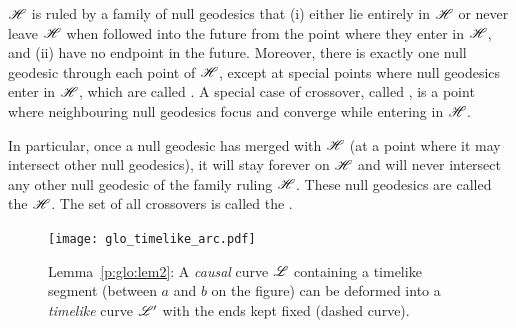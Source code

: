 \begin{prop}
\label{p:glo:prop3}
$\mathscr{H}$ is ruled by a family of null geodesics that (i) either lie entirely
in $\mathscr{H}$ or never leave $\mathscr{H}$ when followed into the future from the
point where they enter in $\mathscr{H}$, and
(ii) have no endpoint in the future.
Moreover, there is exactly one null geodesic through each point of $\mathscr{H}$,
except at special points where null geodesics enter in $\mathscr{H}$, which are
called . A special case
of crossover, called , is a point
where neighbouring null geodesics focus and converge while entering in $\mathscr{H}$.
\end{prop}
In particular, once a null geodesic has
merged with $\mathscr{H}$ (at a point where it may intersect other null geodesics),
it will stay forever on $\mathscr{H}$ and will never intersect any other null geodesic
of the family ruling $\mathscr{H}$. These null geodesics are called the
 $\mathscr{H}$.
The set of all crossovers is called the 
\cite{Siino98a,Siino98b,Brill14}.

\begin{figure}
\centerline{\texttt{[image: glo\_timelike\_arc.pdf]}}
\caption[]{\label{f:glo:timelike_arc} \footnotesize
Lemma~\ref{p:glo:lem2}: A \emph{causal} curve $\mathscr{L}$ containing a timelike segment (between
$a$ and $b$ on the figure) can be deformed into a \emph{timelike} curve $\mathscr{L}'$
with the ends kept fixed (dashed curve).}
\end{figure}


